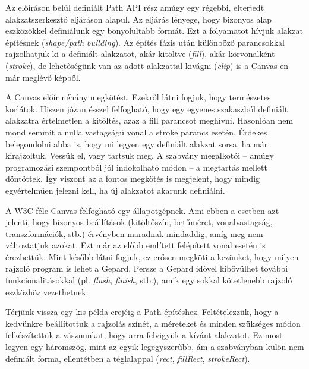 \documentclass[12pt]{report}
\theoremstyle{definition}
\newcommand{\inenglish}[1]{\textsl{#1}}
\begin{document}
Az előíráson belül definiált Path API rész amúgy egy régebbi, elterjedt
alakzatszerkesztő eljáráson alapul. Az eljárás lényege, hogy bizonyos alap
eszközökkel definiálunk egy bonyolultabb formát. Ezt a folyamatot hívjuk
alakzat építésnek (\inenglish{shape/path building}). Az építés fázis után
különböző parancsokkal rajzolhatjuk ki a definiált alakzatot, akár kitöltve
(\emph{fill}), akár körvonalként (\emph{stroke}), de lehetőségünk van az adott
alakzattal kivágni (\emph{clip}) is a Canvas-en már meglévő képből.

A Canvas előír néhány megkötést. Ezekről látni fogjuk, hogy természetes
korlátok. Hiszen józan ésszel felfogható, hogy egy egyenes szakaszból definiált
alakzatra értelmetlen a kitöltés, azaz a fill parancsot meghívni. Hasonlóan nem
mond semmit a nulla vastagságú vonal a stroke parancs esetén. Érdekes
belegondolni abba is, hogy mi legyen egy definiált alakzat sorsa, ha már
kirajzoltuk. Vessük el, vagy tartsuk meg. A szabvány megalkotói -- amúgy
programozási szempontból jól indokolható módon -- a megtartás mellett
döntöttek. Így viszont az a fontos megkötés is megjelent, hogy mindig
egyértelműen jelezni kell, ha új alakzatot akarunk definiálni.

A W3C-féle Canvas felfogható egy állapotgépnek. Ami ebben a esetben azt
jelenti, hogy bizonyos beállítások (kitöltőszín, betűméret, vonalvastagság,
transzformációk, stb.) érvényben maradnak mindaddig, amíg meg nem változtatjuk
azokat. Ezt már az előbb említett felépített vonal esetén is érezhettük. Mint
később látni fogjuk, ez erősen megköti a kezünket, hogy milyen rajzoló program
is lehet a Gepard. Persze a Gepard idővel kibővülhet további
funkcionalitásokkal (pl. \emph{flush}, \emph{finish}, stb.), amik egy sokkal
kötetlenebb rajzoló eszközhöz vezethetnek.

Térjünk vissza egy kis példa erejéig a Path építéshez. Feltételezzük, hogy a
kedvünkre beállítottuk a rajzolás színét, a méreteket és minden szükséges módon
felkészítettük a vásznunkat, hogy arra felvigyük a kívánt alakzatot. Ez most
legyen egy háromszög, mint az egyik legegyszerűbb, ám a szabványban külön nem
definiált forma, ellentétben a téglalappal (\emph{rect}, \emph{fillRect},
\emph{strokeRect}).
\end{document}
